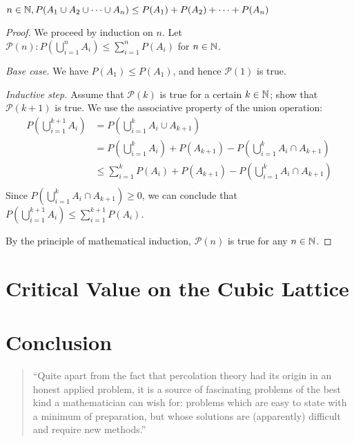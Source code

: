 \documentclass[a4paper, 12pt]{article}
\begin{document}
\begin{lem}\label{lem:union_bound}
$n \in \mathbb{N}, P(A_1 \cup A_2 \cup \cdots \cup A_n) \leq P(A_1) + P(A_2) + \cdots + P(A_n)$
\end{lem}
\begin{proof}[Proof]
We proceed by induction on $n$. Let $\mathcal{P}(n): P(\bigcup_{i = 1}^n A_i) \leq \sum_{i = 1}^n P(A_i)$ for  $n \in \mathbb{N}$.
\begin{description}
\item \textit{Base case.} We have $P(A_1) \leq P(A_1)$, and hence $\mathcal{P}(1)$ is true.
\item \textit{Inductive step.} Assume that $\mathcal{P}(k)$ is true for a certain $k \in \mathbb{N}$; show that $\mathcal{P}(k + 1)$ is true.
We use the associative property of the union operation:
\begin{align*}
    P(\bigcup_{i = 1}^{k + 1} A_i) 
    &= P(\bigcup_{i = 1}^{k} A_i \cup A_{k + 1})\\
    &= P(\bigcup_{i = 1}^{k} A_i) + P(A_{k + 1}) - P(\bigcup_{i = 1}^{k} A_i \cap A_{k + 1})\\
    &\leq \sum_{i = 1}^k P(A_i) + P(A_{k + 1}) - P(\bigcup_{i = 1}^{k} A_i \cap A_{k + 1})\\
\end{align*}
Since $P(\bigcup_{i = 1}^{k} A_i \cap A_{k + 1}) \geq 0$, we can conclude that $P(\bigcup_{i = 1}^{k + 1} A_i) \leq \sum_{i = 1}^{k + 1} P(A_i)$.
\end{description}
By the principle of mathematical induction, $\mathcal{P}(n)$ is true for any $n \in \mathbb{N}$.
\end{proof}

\section{Critical Value on the Cubic Lattice}

\section{Conclusion}
\begin{quotation}
``Quite apart from the fact that percolation theory had its origin in an honest applied problem, it is a source of fascinating problems of the best kind a mathematician can wish for: problems which are easy to state with a minimum of preparation, but whose solutions are (apparently) difficult and require new methods.''
\end{quotation}

\nocite{*}
\printbibliography
\end{document}
